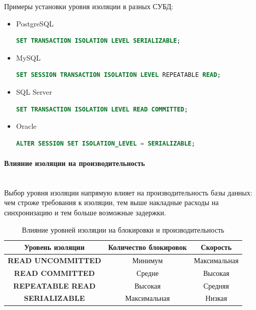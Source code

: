 Примеры установки уровня изоляции в разных СУБД:
 \begin{itemize}
     \item PostgreSQL
     \begin{lstlisting}[language=SQL]
         SET TRANSACTION ISOLATION LEVEL SERIALIZABLE;
     \end{lstlisting}
 
     \item MySQL
     \begin{lstlisting}[language=SQL]
         SET SESSION TRANSACTION ISOLATION LEVEL REPEATABLE READ;
     \end{lstlisting}
 
     \item SQL Server
     \begin{lstlisting}[language=SQL]
         SET TRANSACTION ISOLATION LEVEL READ COMMITTED;
     \end{lstlisting}
 
     \item Oracle
     \begin{lstlisting}[language=SQL]
        ALTER SESSION SET ISOLATION_LEVEL = SERIALIZABLE;
     \end{lstlisting}
 
 \end{itemize}
 
 \paragraph{Влияние изоляции на производительность} ~\\
 
 Выбор уровня изоляции напрямую влияет на производительность базы данных: чем строже требования к изоляции, тем выше накладные расходы на синхронизацию и тем больше возможные задержки.
 
 \begin{table}[H]
     \centering
     \begin{tabular}{|c|c|c|}
         \hline
         \textbf{Уровень изоляции} & \textbf{Количество блокировок} & \textbf{Скорость} \\
         \hline
         \textbf{READ UNCOMMITTED} & Минимум & Максимальная \\
         \hline
         \textbf{READ COMMITTED} & Средне & Высокая \\
         \hline
         \textbf{REPEATABLE READ} & Высокая & Средняя \\
         \hline
         \textbf{SERIALIZABLE} & Максимальная & Низкая \\
         \hline
     \end{tabular}
     \caption{Влияние уровней изоляции на блокировки и производительность}
     \label{tab:isolation_performance}
 \end{table}
 
